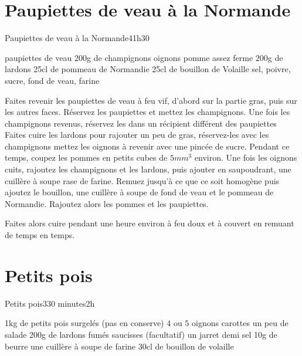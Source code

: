 {\section{Paupiettes de veau à la Normande}
\begin{recette}{Paupiettes de veau à la Normande}{4}{1h30}{}
\begin{ingredients}
 paupiettes de veau
\ingredient 200g de champignons
 oignons
 pomme assez ferme
\ingredient 200g de lardons
\ingredient 25cl de pommeau de Normandie
\ingredient 25cl de bouillon de Volaille
\ingredient sel, poivre, sucre, fond de veau, farine
\end{ingredients}

\begin{preparation}
\etape Faites revenir les paupiettes de veau à feu vif, d'abord sur la partie gras, puis sur les autres faces. 
\etape Réservez les paupiettes et mettez les champignons.
\etape Une fois les champignons revenus, réservez les dans un récipient différent des paupiettes
\etape Faites cuire les lardons pour rajouter un peu de gras, réservez-les avec les champignons
\etape mettez les oignons à revenir avec une pincée de sucre. 
\etape Pendant ce temps, coupez les pommes en petits cubes de $5\unit{mm^3}$ environ. 
\etape Une fois les oignons cuits, rajoutez les champignons et les lardons, puis ajouter en saupoudrant, une cuillère à soupe 
rase de farine. Remuez jusqu'à ce que ce soit homogène puis ajoutez le bouillon, une cuillère à soupe de fond de veau et le 
pommeau de Normandie. 
\etape Rajoutez alors les pommes et les paupiettes.
\end{preparation}

\begin{cuisson}
Faites alors cuire pendant une heure environ à feu doux et à couvert en remuant de temps en temps.
\end{cuisson}


\end{recette}

\section{Petits pois}
\begin{recette}{Petits pois}{3}{30 minutes}{2h}
\begin{ingredients}
\ingredient 1kg de petits pois surgelés (pas en conserve)
\ingredient $4$ ou $5$ oignons
 carottes
\ingredient un peu de salade
\ingredient 200g de lardons fumés
 saucisses
\ingredient (facultatif) un jarret demi sel
\ingredient 10g de beurre
\ingredient une cuillère à soupe de farine
\ingredient 30cl de bouillon de volaille
\end{ingredients}


\end{recette}}
